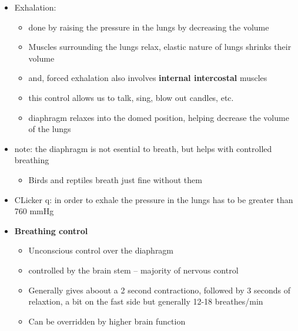 \documentclass{article}
\theoremstyle{definition}
\begin{document}
\begin{itemize}
\begin{itemize}
		\end{itemize}
	\item Exhalation:
		\begin{itemize}
			\item done by raising the pressure in the lungs by decreasing the volume
			\item Muscles surrounding the lungs relax, elastic nature of lungs shrinks their volume
			\item and, forced exhalation also involves \textbf{internal intercostal} muscles
			\item this control allows us to talk, sing, blow out candles, etc.
			\item diaphragm relaxes into the domed position, helping decrease the volume of the lungs
		\end{itemize}
	\item note: the diaphragm is not esential to breath, but helps with controlled breathing
		\begin{itemize}
			\item Birds and reptiles breath just fine without them
		\end{itemize}
	\item CLicker q: in order to exhale the pressure in the lungs has to be greater than 760 mmHg
	\item \textbf{Breathing control} 
		\begin{itemize}
			\item Unconscious control over the diaphragm
			\item controlled by the brain stem -- majority of nervous control
			\item Generally gives aboout a 2 second contractiono, followed by 3 seconds of relaxtion, a bit on the fast side but generally 12-18 breathes/min
			\item Can be overridden by higher brain function
		\end{itemize}
\end{itemize}
\end{document}
